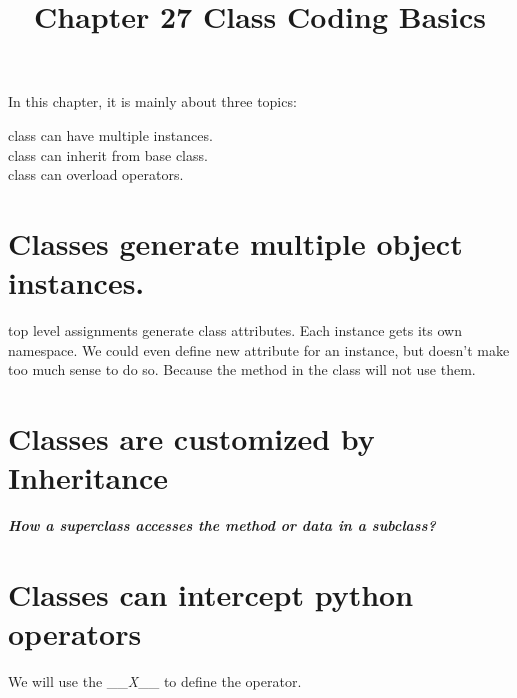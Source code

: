 \documentclass{article}
\begin{document}
\title{Chapter 27 Class Coding Basics}
\maketitle

In this chapter, it is mainly about three topics:

class can have multiple instances.\\

class can inherit from base class.\\

class can overload operators.\\

\section{Classes generate multiple object instances.}
top level assignments generate class attributes.
Each instance gets its own namespace.
We could even define new attribute for an instance, but doesn’t make too much sense to do so. Because the method in the class will not use them.

\section{Classes are customized by Inheritance}

\textbf{\textit{How a superclass accesses the method or data in a subclass?}}

\section{Classes can intercept python operators}

We will use the \_\_\textsl{X}\_\_ to define the operator.
\end{document}
